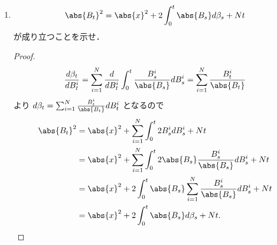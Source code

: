 \documentclass{jsarticle}
\begin{document}
\begin{enumerate}
\begin{proof}
        したがって $\beta$ は $(\clf_t)$-adaptedなCLMである．
        ここで
        \begin{align}
            \gen{\beta, \beta}_t
            &= \gen{\sum_{i=1}^{N}\int_{0}^{\cdot}\frac{B_{s}^{i}}{\abs{B_s}}dB_s^i, \sum_{i=1}^{N}\int_{0}^{\cdot}\frac{B_{s}^{i}}{\abs{B_s}}dB_s^i}_t \\
            &= \sum_{i=1}^{N}\gen{\int_{0}^{\cdot}\frac{B_{s}^{i}}{\abs{B_s}}dB_s^i, \int_{0}^{\cdot}\frac{B_{s}^{i}}{\abs{B_s}}dB_s^i}_t \\
            &= \int_{0}^{t}\frac{\sum_{i=1}^{N}(B_{s}^{i})^2}{\abs{B_s}^2}ds
            = \int_{0}^{t}\frac{\abs{B_s}^2}{\abs{B_s}^2}ds = t
        \end{align}
        が成り立つことより，Thm. 5.12から $\beta$ は0スタートの $(\clf_t)$-BMである．
    \end{proof}
    
    \item
    $$
    \abs{B_t}^2
    = \abs{x}^2+2\int_0^t \abs{B_s}d\beta_s+Nt
    $$
    が成り立つことを示せ．
    \begin{proof}
        \begin{align}
            \frac{d\beta_t}{dB_t^i}
            = \sum_{i=1}^{N}\frac{d}{dB_t^i}\int_0^t\frac{B_{s}^{i}}{\abs{B_s}}dB_s^i
            = \sum_{i=1}^{N}\frac{B_{t}^{i}}{\abs{B_t}}
        \end{align}
        より $d\beta_t=\sum_{i=1}^{N}\frac{B_{t}^{i}}{\abs{B_t}}dB_t^i$ となるので
        \begin{align}
            \abs{B_t}^2
            &= \abs{x}^2
            + \sum_{i=1}^{N}\int_{0}^{t}2B_s^i dB_s^i
            + Nt \\
            &= \abs{x}^2
            + \sum_{i=1}^{N}\int_{0}^{t}2\abs{B_s}\frac{B_{s}^{i}}{\abs{B_s}}dB_s^i
            + Nt \\
            &= \abs{x}^2
            + 2\int_{0}^{t}\abs{B_s}\sum_{i=1}^{N}\frac{B_{s}^{i}}{\abs{B_s}}dB_s^i
            + Nt \\
            &= \abs{x}^2
            + 2\int_{0}^{t}\abs{B_s}d\beta_s
            + Nt.
        \end{align}
    \end{proof}
    

\end{enumerate}
\end{document}
